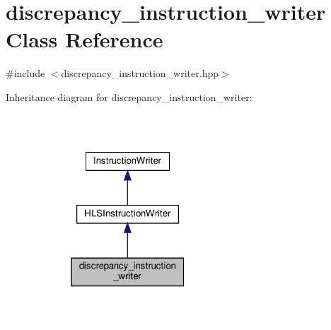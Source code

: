 \hypertarget{classdiscrepancy__instruction__writer}{}\section{discrepancy\+\_\+instruction\+\_\+writer Class Reference}
\label{classdiscrepancy__instruction__writer}


{\ttfamily \#include $<$discrepancy\+\_\+instruction\+\_\+writer.\+hpp$>$}



Inheritance diagram for discrepancy\+\_\+instruction\+\_\+writer\+:
\nopagebreak
\begin{figure}[H]
\begin{center}
\leavevmode
\includegraphics[width=199pt]{d8/d76/classdiscrepancy__instruction__writer__inherit__graph}
\end{center}
\end{figure}


